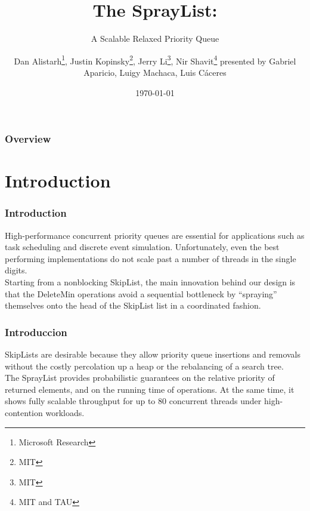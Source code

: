 \documentclass{beamer}
\title[The SprayList]{The SprayList:} %
\subtitle{A Scalable Relaxed Priority Queue}
\author[Autores]{Dan Alistarh\footnote{Microsoft Research}, Justin Kopinsky\footnote{MIT}, Jerry Li\footnote{MIT}, Nir Shavit\footnote{MIT and TAU} 
\newline 
\small{presented by} 
\newline \normalsize {Gabriel Aparicio, Luigy Machaca, Luis Cáceres} }  %
\institute[UNSA] %
{
Universidad Nacional de San Agustín\\ %
\medskip
}
\date{\today} %
\begin{document}
\begin{frame}
\titlepage %
\end{frame}

\begin{frame}
\frametitle{Overview} %
\tableofcontents %
\end{frame}


\section{Introduction}

\begin{frame}
\frametitle{Introduction}
High-performance concurrent priority queues are essential for applications
such as task scheduling and discrete event simulation.
Unfortunately, even the best performing implementations do not
scale past a number of threads in the single digits.\\

Starting from a nonblocking
SkipList, the main innovation behind our design is that
the DeleteMin operations avoid a sequential bottleneck by “spraying”
themselves onto the head of the SkipList list in a coordinated
fashion.

\end{frame}

\begin{frame}
\frametitle{Introduccion}
SkipLists are desirable because they allow priority queue insertions
and removals without the costly percolation up a heap or
the rebalancing of a search tree.\\
The SprayList provides probabilistic guarantees
on the relative priority of returned elements, and on the running
time of operations. At the same time, it shows fully scalable
throughput for up to 80 concurrent threads under high-contention
workloads.


\end{frame}
\end{document}
